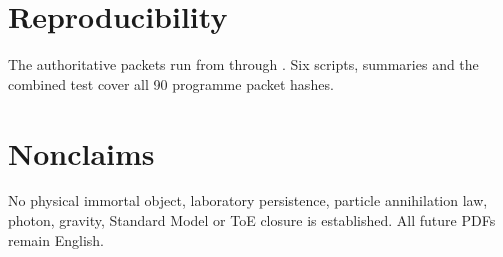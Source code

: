 \documentclass[11pt,a4paper]{article}
\begin{document}
\appendix\section{Reproducibility}
The authoritative packets run from  through . Six scripts, summaries and the combined test cover all 90 programme packet hashes.

\section{Nonclaims}
No physical immortal object, laboratory persistence, particle annihilation law, photon, gravity, Standard Model or ToE closure is established. All future PDFs remain English.
\end{document}
